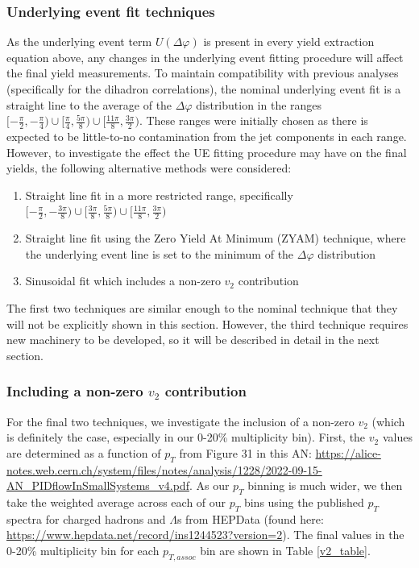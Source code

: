 \subsubsection{Underlying event fit techniques}
\label{sec:ue_fit_systematics}

As the underlying event term $U(\Delta\varphi)$ is present in every yield extraction equation above, any changes in the underlying event fitting procedure will affect the final yield measurements. To maintain compatibility with previous analyses (specifically for the dihadron correlations), the nominal underlying event fit is a straight line to the average of the $\Delta\varphi$ distribution in the ranges $[-\frac{\pi}{2}, -\frac{\pi}{4}) \cup [\frac{\pi}{4}, \frac{5\pi}{8}) \cup [\frac{11\pi}{8}, \frac{3\pi}{2})$. These ranges were initially chosen as there is expected to be little-to-no contamination from the jet components in each range. However, to investigate the effect the UE fitting procedure may have on the final yields, the following alternative methods were considered:
%
\begin{enumerate}
    \item Straight line fit in a more restricted range, specifically $[-\frac{\pi}{2}, -\frac{3\pi}{8}) \cup [\frac{3\pi}{8}, \frac{5\pi}{8}) \cup [\frac{11\pi}{8}, \frac{3\pi}{2})$
    \item Straight line fit using the Zero Yield At Minimum (ZYAM) technique, where the underlying event line is set to the minimum of the $\Delta\varphi$ distribution
    \item Sinusoidal fit which includes a non-zero $v_{2}$ contribution
\end{enumerate}
%
The first two techniques are similar enough to the nominal technique that they will not be explicitly shown in this section. However, the third technique requires new machinery to be developed, so it will be described in detail in the next section.

\subsubsection{Including a non-zero $v_{2}$ contribution}
\label{sec:ue_fit_v2}

For the final two techniques, we investigate the inclusion of a non-zero $v_{2}$ (which is definitely the case, especially in our 0-20\% multiplicity bin). First, the $v_{2}$ values are determined as a function of $p_{T}$ from Figure 31 in this AN: \url{https://alice-notes.web.cern.ch/system/files/notes/analysis/1228/2022-09-15-AN_PIDflowInSmallSystems_v4.pdf}. As our $p_{T}$ binning is much wider, we then take the weighted average across each of our $p_{T}$ bins using the published $p_{T}$ spectra for charged hadrons and $\Lambda$s from HEPData (found here: \url{https://www.hepdata.net/record/ins1244523?version=2}). The final values in the 0-20\% multiplicity bin for each $p_{T, assoc}$ bin are shown in Table \ref{v2_table}. 

